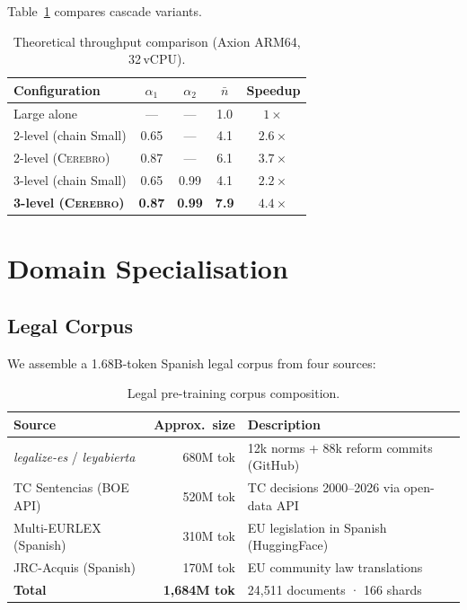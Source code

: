 \documentclass[11pt,a4paper]{article}
\newcommand{\cerebro}{\textsc{Cerebro}}
\begin{document}
Table~\ref{tab:speedup} compares cascade variants.

\begin{table}[h]
\centering
\caption{Theoretical throughput comparison (Axion ARM64, 32\,vCPU).}
\label{tab:speedup}
\begin{tabular}{lcccc}
\toprule
Configuration & $\alpha_1$ & $\alpha_2$ & $\bar{n}$ & Speedup \\
\midrule
Large alone               & —    & —    & 1.0 & $1\times$  \\
2-level (chain Small)     & 0.65 & —    & 4.1 & $2.6\times$ \\
2-level (\cerebro{})      & 0.87 & —    & 6.1 & $3.7\times$ \\
3-level (chain Small)     & 0.65 & 0.99 & 4.1 & $2.2\times$ \\
\textbf{3-level (\cerebro{})} & \textbf{0.87} & \textbf{0.99}
                          & \textbf{7.9} & $\mathbf{4.4\times}$ \\
\bottomrule
\end{tabular}
\end{table}

\section{Domain Specialisation}
\label{sec:domain}

\subsection{Legal Corpus}

We assemble a 1.68B-token Spanish legal corpus from four sources:

\begin{table}[h]
\centering
\caption{Legal pre-training corpus composition.}
\label{tab:corpus}
\begin{tabular}{lrl}
\toprule
Source & Approx.\ size & Description \\
\midrule
\textit{legalize-es} / \textit{leyabierta} & 680M tok
  & 12k norms + 88k reform commits (GitHub) \\
TC Sentencias (BOE API) & 520M tok
  & TC decisions 2000–2026 via open-data API \\
Multi-EURLEX (Spanish) & 310M tok
  & EU legislation in Spanish (HuggingFace) \\
JRC-Acquis (Spanish) & 170M tok
  & EU community law translations \\
\midrule
\textbf{Total} & \textbf{1,684M tok} & 24,511 documents · 166 shards \\
\bottomrule
\end{tabular}
\end{table}
\end{document}
